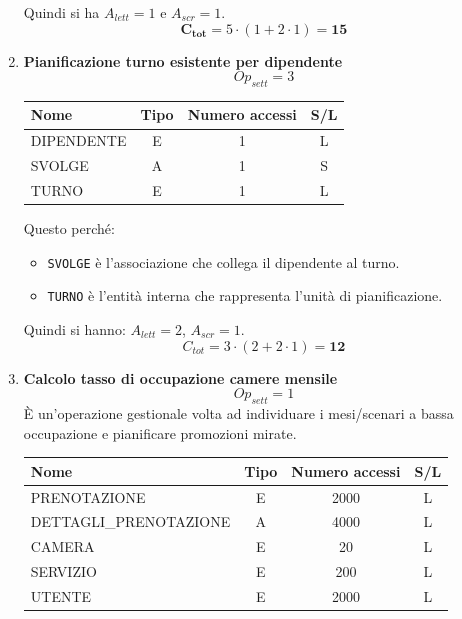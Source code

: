 \documentclass[a4paper,12pt]{report}
\begin{document}
\begin{enumerate}
	      Quindi si ha $A_{lett}=1$ e $A_{scr}=1$.
	      $$\mathbf{C_{tot}} = 5 \cdot (1 + 2 \cdot 1) = \mathbf{15}$$

	\item {\large \textbf{Pianificazione turno esistente per dipendente}} \label{op18}
	      $$
		      Op_{sett} = 3
	      $$

		\begin{table}[H]
		\centering
		\small
		\renewcommand{\arraystretch}{1.15}
		\begin{tabularx}{0.8\textwidth}{|X|c|c|c|}
				\hline
				\rowcolor{gray!20}
				\textbf{Nome} & \textbf{Tipo} & \textbf{Numero accessi} & \textbf{S/L} \\
				\hline
				DIPENDENTE & E & 1 & L \\
				SVOLGE     & A & 1 & S \\
				TURNO      & E & 1 & L \\
				\hline
			\end{tabularx}
		\end{table}

		
		  Questo perché:
	      \begin{itemize}
		      \item \texttt{SVOLGE} è l'associazione che collega il dipendente al turno.
		      \item \texttt{TURNO} è l'entità interna che rappresenta l'unità di pianificazione.
	      \end{itemize}

	      Quindi si hanno: $A_{lett}=2$, $A_{scr}=1$.
	      $$C_{tot} = 3 \cdot (2 + 2 \cdot 1) = \mathbf{12}$$


	\item {\large \textbf{Calcolo tasso di occupazione camere mensile}} \label{op19}
	      $$
		      {Op}_{sett} = 1
	      $$
	      È un'operazione gestionale volta ad individuare i mesi/scenari a bassa occupazione e pianificare promozioni mirate.

	      \begin{table}[H]
		      \centering
		      \small
		      \renewcommand{\arraystretch}{1.15}
		      \begin{tabularx}{0.8\textwidth}{|X|c|c|c|}
			      \hline
			      \rowcolor{gray!20}
			      \textbf{Nome}          & \textbf{Tipo} & \textbf{Numero accessi} & \textbf{S/L} \\
			      \hline
			      PRENOTAZIONE           & E             & 2000                    & L            \\
			      DETTAGLI\_PRENOTAZIONE & A             & 4000                    & L            \\
			      CAMERA                 & E             & 20                      & L            \\
			      SERVIZIO               & E             & 200                     & L            \\
			      UTENTE                 & E             & 2000                    & L            \\
			      \hline
		      \end{tabularx}
	      \end{table}


\end{enumerate}
\end{document}
